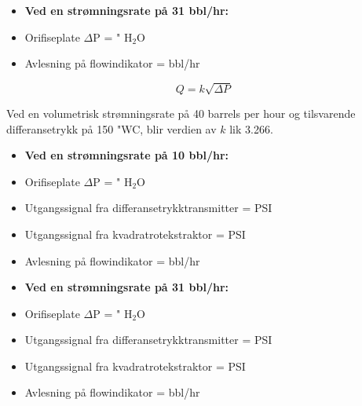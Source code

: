 \vskip 10pt

\begin{itemize}
\item {} {\bf Ved en strømningsrate på 31 bbl/hr:}
\vskip 5pt
\item{} Orifiseplate $\Delta$P =  " H$_{2}$O
\vskip 5pt
\item{} Avlesning på flowindikator =  bbl/hr
\end{itemize}







$$Q = k \sqrt{\Delta P}$$

Ved en volumetrisk strømningsrate på 40 barrels per hour og tilsvarende differansetrykk på 150 "WC, blir verdien av $k$ lik 3.266.

\begin{itemize}
\item {} {\bf Ved en strømningsrate på 10 bbl/hr:}
\vskip 5pt
\item{} Orifiseplate $\Delta$P =  " H$_{2}$O
\vskip 5pt
\item{} Utgangssignal fra differansetrykktransmitter =  PSI
\vskip 5pt
\item{} Utgangssignal fra kvadratrotekstraktor =  PSI
\vskip 5pt
\item{} Avlesning på flowindikator =  bbl/hr
\end{itemize}

\vskip 10pt

\begin{itemize}
\item {} {\bf Ved en strømningsrate på 31 bbl/hr:}
\vskip 5pt
\item{} Orifiseplate $\Delta$P =  " H$_{2}$O
\vskip 5pt
\item{} Utgangssignal fra differansetrykktransmitter =  PSI
\vskip 5pt
\item{} Utgangssignal fra kvadratrotekstraktor =  PSI
\vskip 5pt
\item{} Avlesning på flowindikator =  bbl/hr
\end{itemize}


